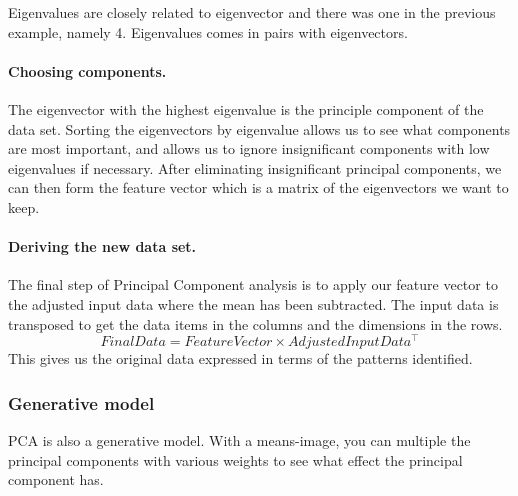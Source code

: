 Eigenvalues are closely related to eigenvector and there was one in the previous example, namely 4.
Eigenvalues comes in pairs with eigenvectors.

\paragraph{Choosing components.}
The eigenvector with the highest eigenvalue is the principle component of the data set.
Sorting the eigenvectors by eigenvalue allows us to see what components are most important, and allows us to ignore insignificant components with low eigenvalues if necessary.
After eliminating insignificant principal components, we can then form the feature vector which is a matrix of the eigenvectors we want to keep.


\paragraph{Deriving the new data set.}
The final step of Principal Component analysis is to apply our feature vector to the adjusted input data where the mean has been subtracted.
The input data is transposed to get the data items in the columns and the dimensions in the rows.
$$FinalData = FeatureVector\times AdjustedInputData^\top $$ %
This gives us the original data expressed in terms of the patterns identified.


\subsubsection{Generative model}
PCA is also a generative model.
With a means-image, you can multiple the principal components with various weights to see what effect the principal component has.
